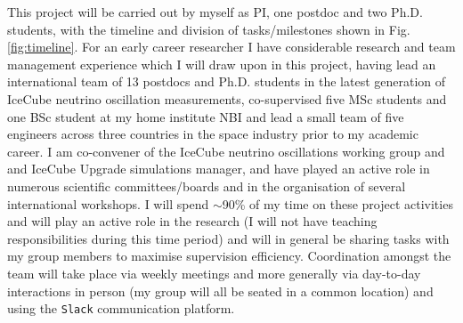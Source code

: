 \documentclass[a4paper,11pt]{article}
\begin{document}
This project will be carried out by myself as PI, one postdoc and two Ph.D. students, with the timeline and division of tasks/milestones shown in Fig. \ref{fig:timeline}. For an early career researcher I have considerable research and team management experience which I will draw upon in this project, having lead an international team of 13 postdocs and Ph.D. students in the latest generation of IceCube neutrino oscillation measurements, co-supervised five MSc students and one BSc student at my home institute NBI and lead a small team of five engineers across three countries in the space industry prior to my academic career. I am co-convener of the IceCube neutrino oscillations working group and and IceCube Upgrade simulations manager, and have played an active role in numerous scientific committees/boards and in the organisation of several international workshops. I will spend $\sim$90\% of my time on these project activities and will play an active role in the research (I will not have teaching responsibilities during this time period) and will in general be sharing tasks with my group members to maximise supervision efficiency. Coordination amongst the team will take place via weekly meetings and more generally via day-to-day interactions in person (my group will all be seated in a common location) and using the \texttt{Slack} communication platform. 
\end{document}
